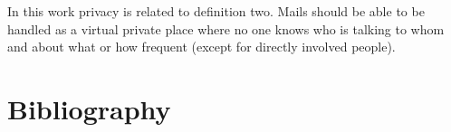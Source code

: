 \documentclass[11pt,a4paper]{book}
\newenvironment{entry}{\par\leavevmode\hangpara{1.5mm}{1}\ignorespaces}{\RaggedRight\par}
\begin{document}
\begin{appendices}
\begin{entry}
{  In this work privacy is related to definition two. Mails should be able to be handled as a virtual private place where no one knows who is talking to whom and about what or how frequent (except for directly involved people).
}\end{entry}


\chapter{Bibliography}
\printbibliography[title={},heading=none]

\printindex

\begin{comment}

\end{comment}
\end{appendices}

\begin{comment}
http://www.rfc-editor.org/pubprocess.html
RFC2223 Instructions to RFC Authors
RFC2119 BCP14 Key words for use in RFCs to Indicate Requirement Levels
RFC3979 BCP79 Intellectual Property Rights in IETF Technology
RFC5378 BCP78 Rights Contributors Provide to the IETF Trust


http://tex.stackexchange.com/questions/36307/formatting-back-references-in-bibliography
http://www.cs.columbia.edu/irt/software/l2x/ l2x -- conversion from LaTeX to other formats Version 1.13
http://ftp.gwdg.de/pub/ctan/support/l2x/
http://tools.ietf.org/tools/xml2rfc2

http://www.zisc.ethz.ch/events/2003-2011/ISC2006Slides/FederrathZISCTalk.pdf

Professorliste
Dr. Christoph Sprenger (Part I)
-Prof. David Basin
Gregory Demay
Peter Gazi
Dr. Srdjan Marinovic
Dr. Sasa Radomirovic
Dr. Ralf Sasse

T. Hoefler
A. Perrig 
-Dr. Jan Camenisch (Keine Berechtigung)

-Srdjan Capkun (Keine Kapazität)
-David Basin  (Keine Kapazität)
\end{comment}
\end{document}
